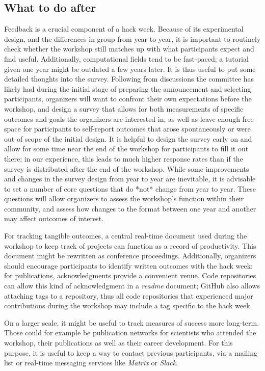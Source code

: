 \documentclass{nature}
\begin{document}
\subsection{What to do after}

Feedback is a crucial component of a hack week. Because of its experimental design, and the differences in group from year to year, it is important to routinely check whether the workshop still matches up with what participants expect and find useful. Additionally, computational fields tend to be fast-paced; a tutorial given one year might be outdated a few years later. It is thus useful to put some detailed thoughts into the survey. Following from discussions the committee has likely had during the initial stage of preparing the announcement and selecting participants, organizers will want to confront their own expectations before the workshop, and design a survey that allows for both measurements of specific outcomes and goals the organizers are interested in, as well as leave enough free space for participants to self-report outcomes that arose spontaneously or were out of scope of the initial design. It is helpful to design the survey early on and allow for some time near the end of the workshop for participants to fill it out there; in our experience, this leads to much higher response rates than if the survey is distributed after the end of the workshop. While some improvements and changes in the survey design from year to year are inevitable, it is advisable to set a number of core questions that do *not* change from year to year. These questions will allow organizers to assess the workshop's function within their community, and assess how changes to the format between one year and another may affect outcomes of interest.

For tracking tangible outcomes, a central real-time document used during the workshop to keep track of projects can function as a record of productivity. This document might be rewritten as conference proceedings. Additionally, organizers should encourage participants to identify written outcomes with the hack week: for publications, acknowledgments provide a convenient venue. Code repositories can allow this kind of acknowledgment in a \textit{readme} document; GitHub also allows attaching tags to a repository, thus all code repositories that experienced major contributions during the workshop may include a tag specific to the hack week.

On a larger scale, it might be useful to track measures of success more long-term. Those could for example be publication networks for scientists who attended the workshop, their publications as well as their career development. For this purpose, it is useful to keep a way to contact previous participants, via a mailing list or real-time messaging services like \textit{Matrix} or \textit{Slack}.
\end{document}
